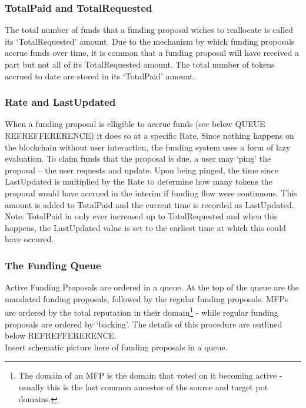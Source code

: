 \subsubsection*{TotalPaid and TotalRequested}
The total number of funds that a funding proposal wiches to reallocate is called its `TotalRequested' amount. Due to the mechanism by which funding proposals accrue funds over time, it is common that a funding proposal will have received a part but not all of its TotalRequested amount. The total number of tokens accrued to date are stored in its `TotalPaid' amount. 

\subsubsection*{Rate and LastUpdated}
When a funding proposal is elligible to accrue funds (see below QUEUE REFREFFERERENCE) it does so at a specific Rate. Since nothing happens on the blockchain without user interaction, the funding system uses a form of lazy evaluation. To claim funds that the proposal is due, a user may `ping' the proposal -- the user requests and update. Upon being pinged, the time since LastUpdated is multiplied by the Rate to determine how many tokens the proposal would have accrued in the interim if funding flow were continuous. This amount is added to TotalPaid and the current time is recorded as LastUpdated.\\
Note: TotalPaid in only ever increased up to TotalRequested and when this happens, the LastUpdated value is set to the earliest time at which this could have occured.

\subsubsection{The Funding Queue}
Active Funding Proposals are ordered in a queue. At the top of the queue are the mandated funding proposals, followed by the regular funding proposals. MFPs are ordered by the total reputation in their domain\footnote{The domain of an MFP is the domain that voted on it becoming active - usually this is the last common ancestor of the source and target pot domains.} - while regular funding proposals are ordered by `backing'.  The details of this procedure are outlined below REFREFFERERENCE.\\



Insert schematic picture here of funding proposals in a queue.\\[2cm]








